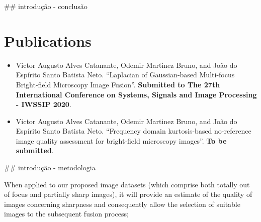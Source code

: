 ## introdução - conclusão

\section*{Publications}

\begin{itemize}
    \item Victor Augusto Alves Catanante, Odemir Martinez Bruno, and João do Espírito Santo Batista Neto. ``Laplacian of Gaussian-based Multi-focus Bright-field Microscopy Image Fusion''. \textbf{Submitted to The 27th International Conference on Systems, Signals and Image Processing - IWSSIP 2020}.
    
    \item \cite{catanante2020frequency} Victor Augusto Alves Catanante, Odemir Martinez Bruno, and João do Espírito Santo Batista Neto. ``Frequency domain kurtosis-based no-reference image quality assessment for bright-field microscopy images''. \textbf{To be submitted}.
\end{itemize}

## introdução - metodologia

When applied to our proposed image datasets (which comprise both totally out of focus and partially sharp images), it will provide an estimate of the quality of images concerning sharpness and consequently allow the selection of suitable images to the subsequent fusion process;